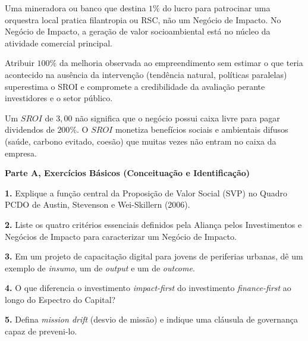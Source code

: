 \begin{boxErro}
Uma mineradora ou banco que destina $1\%$ do lucro para patrocinar uma orquestra local pratica filantropia ou RSC, não um Negócio de Impacto. No Negócio de Impacto, a geração de valor socioambiental está no núcleo da atividade comercial principal.
\end{boxErro}

\begin{boxErro}
Atribuir $100\%$ da melhoria observada ao empreendimento sem estimar o que teria acontecido na ausência da intervenção (tendência natural, políticas paralelas) superestima o SROI e compromete a credibilidade da avaliação perante investidores e o setor público.
\end{boxErro}

\begin{boxErro}
Um $SROI$ de $3{,}00$ não significa que o negócio possui caixa livre para pagar dividendos de $200\%$. O $SROI$ monetiza benefícios sociais e ambientais difusos (saúde, carbono evitado, coesão) que muitas vezes não entram no caixa da empresa.
\end{boxErro}


\textbf{Parte A, Exercícios Básicos (Conceituação e Identificação)}

\textbf{1.} Explique a função central da Proposição de Valor Social (SVP) no Quadro PCDO de Austin, Stevenson e Wei-Skillern (2006).
\espacoResolucao[1.8cm]

\textbf{2.} Liste os quatro critérios essenciais definidos pela Aliança pelos Investimentos e Negócios de Impacto para caracterizar um Negócio de Impacto.
\espacoResolucao[1.8cm]

\textbf{3.} Em um projeto de capacitação digital para jovens de periferias urbanas, dê um exemplo de \textit{insumo}, um de \textit{output} e um de \textit{outcome}.
\espacoResolucao[1.8cm]

\textbf{4.} O que diferencia o investimento \textit{impact-first} do investimento \textit{finance-first} ao longo do Espectro do Capital?
\espacoResolucao[1.8cm]

\textbf{5.} Defina \textit{mission drift} (desvio de missão) e indique uma cláusula de governança capaz de preveni-lo.
\espacoResolucao[1.8cm]

